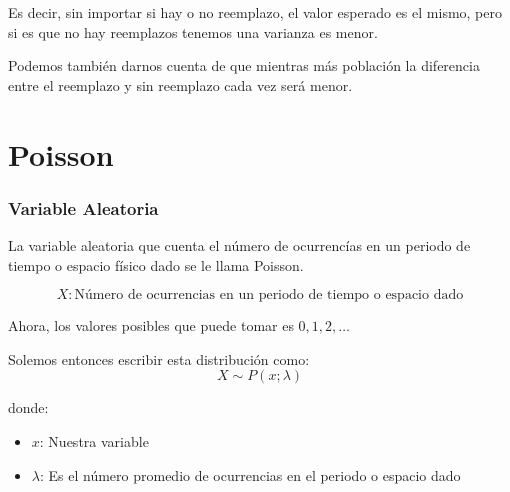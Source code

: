 \documentclass[12pt, fleqn]{report}                             %
\theoremstyle{break}                                            %
\begin{document}
                Es decir, sin importar si hay o no reemplazo, el valor esperado es el mismo, pero
                si es que no hay reemplazos tenemos una varianza es menor.

                Podemos también darnos cuenta de que mientras más población la diferencia entre
                el reemplazo y sin reemplazo cada vez será menor.


        \clearpage
        \section{Poisson}


            \vspace{1em}
            \subsubsection{Variable Aleatoria}

                La variable aleatoria que cuenta el número de ocurrencías en un periodo
                de tiempo o espacio físico dado se le llama Poisson.

                \begin{equation*}
                    X : \text{Número de ocurrencias en un periodo de tiempo o espacio dado}
                \end{equation*}

                Ahora, los valores posibles que puede tomar es $0, 1, 2, \dots$

                Solemos entonces escribir esta distribución como:
                \begin{equation*}
                    X \sim P(x; \lambda)
                \end{equation*}

                donde:
                \begin{itemize}
                    \item $x$: Nuestra variable
                    \item $\lambda$: Es el número promedio de ocurrencias en el periodo o espacio dado
                \end{itemize}
\end{document}

